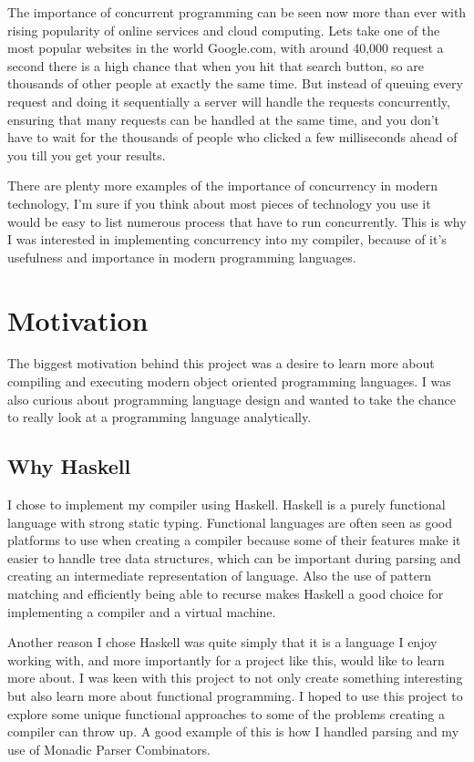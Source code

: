 The importance of concurrent programming can be seen now more than ever with rising popularity of online services and cloud computing. Lets take one of the most popular websites in the world Google.com, with around 40,000 request a second there is a high chance that when you hit that search button, so are thousands of other people at exactly the same time. But instead of queuing every request and doing it sequentially a server will handle the requests concurrently, ensuring that many requests can be handled at the same time, and you don't have to wait for the thousands of people who clicked a few milliseconds ahead of you till you get your results.

There are plenty more examples of the importance of concurrency in modern technology, I'm sure if you think about most pieces of technology you use it would be easy to list numerous process that have to run concurrently. This is why I was interested in implementing concurrency into my compiler, because of it's usefulness and importance in modern programming languages.   

\section{Motivation}

The biggest motivation behind this project was a desire to learn more about compiling and executing modern object oriented programming languages. I was also curious about programming language design and wanted to take the chance to really look at a programming language analytically.

\subsection{Why Haskell}

I chose to implement my compiler using Haskell. Haskell is a purely functional language with strong static typing. Functional languages are often seen as good platforms to use when creating a compiler because some of their features make it easier to handle tree data structures, which can be important during parsing and creating an intermediate representation of language. Also the use of pattern matching and efficiently being able to recurse makes Haskell a good choice for implementing a compiler and a virtual machine.

Another reason I chose Haskell was quite simply that it is a language I enjoy working with, and more importantly for a project like this, would like to learn more about. I was keen with this project to not only create something interesting but also learn more about functional programming. I hoped to use this project to explore some  unique functional approaches to some of the problems creating a compiler can throw up. A good example of this is how I handled parsing and my use of Monadic Parser Combinators.

